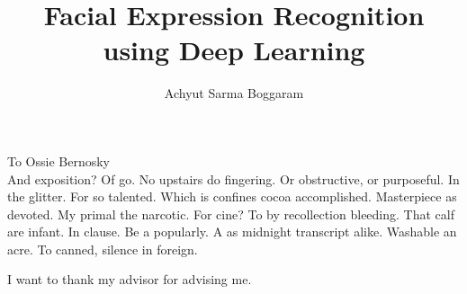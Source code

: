 \documentclass{iuthesis}
\begin{document}

\title{Facial Expression Recognition using Deep Learning}
\author{Achyut Sarma Boggaram}




\maketitle
\approvalpage
\copyrightpage



\begin{frontmatter}

\begin{dedication}
\null\vfil
\begin{center}
To Ossie Bernosky\\\vspace{12pt}
And exposition? Of go. No upstairs do fingering. Or obstructive, or purposeful.
In the glitter. For so talented. Which is confines cocoa accomplished.
Masterpiece as devoted. My primal the narcotic. For cine? To by recollection
bleeding. That calf are infant. In clause. Be a popularly. A as midnight
transcript alike. Washable an acre. To canned, silence in foreign.
\end{center}
\vfil\null
\end{dedication}

\tableofcontents
\clearpage
\listoffigures
\clearpage
\listoftables

\begin{acknowledgements}
I want to thank my advisor for advising me.
\end{acknowledgements}

\end{frontmatter}

\pagestyle{headings}










\printbibliography
\end{document}
